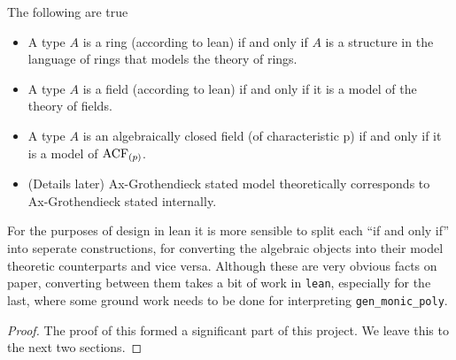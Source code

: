 \begin{prop}
  The following are true
  \begin{itemize}
    \item A type $A$ is a ring (according to lean) if and only if
          $A$ is a structure in the language of rings
          that models the theory of rings.
    \item A type $A$ is a field (according to lean) if and only if
          it is a model of the theory of fields.
    \item A type $A$ is an algebraically closed field (of characteristic p)
          if and only if it is a model of $\operatorname{ACF}_{(p)}$.
    \item (Details later) Ax-Grothendieck stated model theoretically corresponds to
          Ax-Grothendieck stated internally. %
  \end{itemize}
  For the purposes of design in lean it is
  more sensible to split each ``if and only if'' into seperate constructions,
  for converting the algebraic objects into their model theoretic counterparts
  and vice versa.
  Although these are very obvious facts on paper,
  converting between them takes a bit of work in \texttt{lean},
  especially for the last,
  where some ground work needs to be done for interpreting \texttt{gen\_monic\_poly}.
\end{prop}
\begin{proof}
  The proof of this formed a significant part of this project.
  We leave this to the next two sections.
\end{proof}



